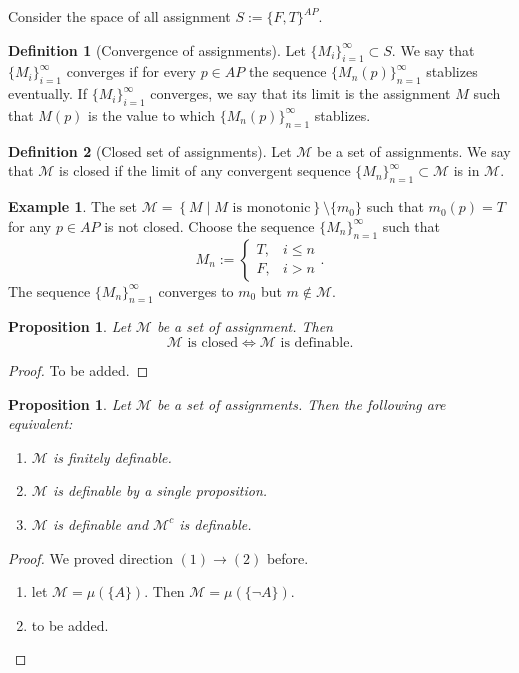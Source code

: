 \documentclass[11pt,a4paper]{article}
\theoremstyle{definition}
\newtheorem{definition}{Definition}[section]
\newtheorem{example}{Example}[section]
\theoremstyle{plain}
\newtheorem{proposition}[theorem]{Proposition}
\newcommand{\set}[2]{ \left\{ #1 \mid #2 \right\} }
\begin{document}
  Consider the space of all assignment $S := \{F, T\}^{AP}$.
  \begin{definition}[Convergence of assignments]
    Let $\{M_i\}_{i=1}^{\infty} \subset S$.
    We say that $\{M_i\}_{i=1}^{\infty}$ converges if for every $p \in AP$
    the sequence $\{M_n(p)\}_{n=1}^{\infty}$ stablizes eventually.
    If $\{M_i\}_{i=1}^{\infty}$ converges, we say that its limit is
    the assignment $M$ such that $M(p)$ is the value to which
    $\{M_n(p)\}_{n=1}^{\infty}$ stablizes.
  \end{definition}
  
  \begin{definition}[Closed set of assignments]
    Let $\mathcal M$ be a set of assignments.
    We say that $\mathcal M$ is closed if the limit of any convergent sequence
    $\{M_n\}_{n=1}^{\infty} \subset \mathcal M$ is in $\mathcal M$.
  \end{definition}
  
  \begin{example}
    The set $\mathcal M = \set{M}{M \text{ is monotonic}} \setminus \{m_0\}$
    such that $m_0(p) = T$ for any $p \in AP$ is not closed.
    Choose the sequence $\{M_n\}_{n=1}^{\infty}$ such that
    \[
      M_n :=
      \begin{cases}
        T, &i \le n \\
        F, &i > n
      \end{cases}.
    \]
    The sequence $\{M_n\}_{n=1}^{\infty}$ converges to $m_0$ but 
    $m \notin \mathcal M$.
  \end{example}

  \begin{proposition}
    Let $\mathcal M$ be a set of assignment. Then
    \[
      \mathcal M \text{ is closed} \iff
      \mathcal M \text{ is definable}.
    \]
  \end{proposition}
  \begin{proof}
    To be added.
  \end{proof}

  \begin{proposition}
    Let $\mathcal M$ be a set of assignments. Then the following are equivalent:
    \begin{enumerate}
      \item[(1)] $\mathcal M$ is finitely definable.
      \item[(2)] $\mathcal M$ is definable by a single proposition.
      \item[(3)] $\mathcal M$ is definable and $\mathcal M^c$ is definable.
    \end{enumerate}
  \end{proposition}
  \begin{proof}
    We proved direction $(1) \to (2)$ before.
    \begin{enumerate}
      \item[$(2) \to (3)$] let $\mathcal M = \mu(\{A\})$.
        Then $\mathcal M = \mu(\{\neg A\})$.
      \item[$(3) \to (1)$] to be added.
    \end{enumerate}
  \end{proof}
\end{document}
